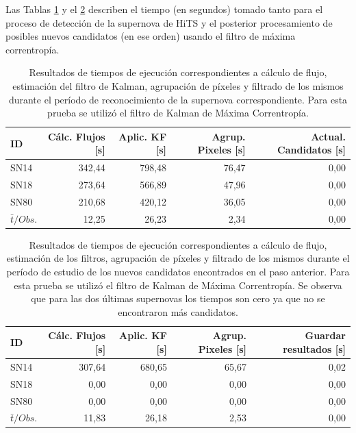 Las Tablas \ref{tab:t3} y el \ref{tab:t4} describen el tiempo (en segundos) tomado tanto para el proceso de detecci\'on de la supernova de HiTS y el posterior procesamiento de posibles nuevos candidatos (en ese orden) usando el filtro de m\'axima correntrop\'ia.
\bigskip
 
\begin{table}[h!]
\centering
\caption{Resultados de tiempos de ejecuci\'on correspondientes a c\'alculo de flujo, estimaci\'on del filtro de Kalman, agrupaci\'on de p\'ixeles y filtrado de los mismos durante el per\'iodo de reconocimiento de la supernova correspondiente. Para esta prueba se utiliz\'o el filtro de Kalman de M\'axima Correntrop\'ia.}
\begin{tabular}{|l|r|r|r|r|}
\hline
\textbf{ID} & \textbf{C\'alc. Flujos [s]} & \textbf{Aplic. KF [s]} &  \textbf{Agrup. Pixeles [s]}  & \textbf{Actual. Candidatos [s]}\\ \hline \hline
SN14        & 342,44            & 798,48        &  76,47 & 0,00 \\ \hline
SN18            & 273,64             & 566,89         &  47,96  & 0,00\\ \hline
SN80            & 210,68             & 420,12         &   36,05 & 0,00 \\ \hline \hline 
$\bar{t}/Obs. $& 12,25 & 26,23 & 2,34 & 0,00\\\hline 
\end{tabular}
\label{tab:t3}
\end{table}

\begin{table}[h!]
\centering
\caption{Resultados de tiempos de ejecuci\'on correspondientes a c\'alculo de flujo, estimaci\'on de los filtros, agrupaci\'on de p\'ixeles y filtrado de los mismos durante el per\'iodo de estudio de los nuevos candidatos encontrados en el paso anterior. Para esta prueba se utiliz\'o el filtro de Kalman de M\'axima Correntrop\'ia. Se observa que para las dos \'ultimas supernovas los tiempos son cero ya que no se encontraron m\'as candidatos.}
\begin{tabular}{|l|r|r|r|r|}
\hline
\textbf{ID} & \textbf{C\'alc. Flujos [s]} & \textbf{Aplic. KF [s]} &  \textbf{Agrup. Pixeles [s]}  & \textbf{Guardar resultados [s]}\\ \hline \hline
SN14        & 307,64            & 680,65        &  65,67 & 0,02 \\ \hline
SN18            & 0,00             & 0,00         &  0,00  & 0,00\\ \hline
SN80            & 0,00             & 0,00         &   0,00 & 0,00 \\ \hline \hline
$\bar{t}/Obs. $& 11,83 & 26,18 & 2,53 & 0,00\\\hline  
\end{tabular}
\label{tab:t4}

\end{table}
\bigskip

